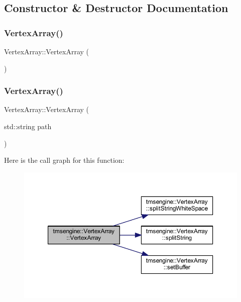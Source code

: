 \subsection{Constructor \& Destructor Documentation}
\mbox{\label{classtmsengine_1_1_vertex_array_ab8a2dcce9698f96dac5f9a19c6979d03}} 
\subsubsection{\texorpdfstring{Vertex\+Array()}{VertexArray()}\hspace{0.1cm}{\footnotesize\ttfamily [1/2]}}
{\footnotesize\ttfamily Vertex\+Array\+::\+Vertex\+Array (\begin{DoxyParamCaption}{ }\end{DoxyParamCaption})}

\mbox{\label{classtmsengine_1_1_vertex_array_ad3790c015fab2f4ca0ac32b1782b7f33}} 
\subsubsection{\texorpdfstring{Vertex\+Array()}{VertexArray()}\hspace{0.1cm}{\footnotesize\ttfamily [2/2]}}
{\footnotesize\ttfamily Vertex\+Array\+::\+Vertex\+Array (\begin{DoxyParamCaption}\item[{std\+::string}]{path }\end{DoxyParamCaption})}

Here is the call graph for this function\+:\nopagebreak
\begin{figure}[H]
\begin{center}
\leavevmode
\includegraphics[width=350pt]{classtmsengine_1_1_vertex_array_ad3790c015fab2f4ca0ac32b1782b7f33_cgraph}
\end{center}
\end{figure}


